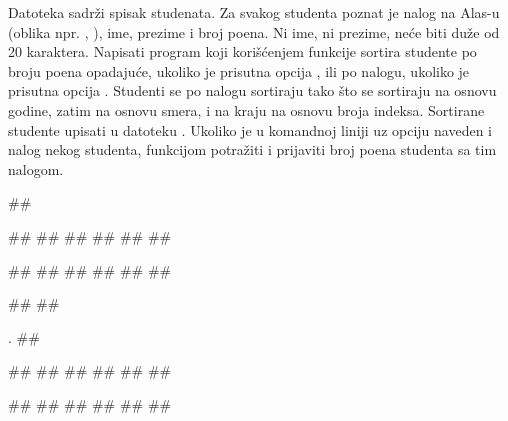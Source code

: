 \begin{Answer}[ref=3_37]
\end{Answer}
\begin{Exercise}[label=3_38]
  Datoteka  sadrži spisak studenata. Za svakog
  studenta poznat je nalog na Alas-u (oblika npr. ,
  ), ime, prezime i broj poena. Ni ime, ni prezime, neće
  biti duže od 20 karaktera. Napisati program koji korišćenjem funkcije  sortira
  studente po broju poena opadajuće, ukoliko je prisutna opcija , ili po nalogu, 
  ukoliko je prisutna opcija . Studenti se po nalogu
  sortiraju tako što se sortiraju na osnovu godine, zatim na osnovu
  smera, i na kraju na osnovu broja indeksa. Sortirane studente
  upisati u datoteku . Ukoliko je u komandnoj liniji
  uz opciju  naveden i nalog nekog studenta, funkcijom
   potražiti i prijaviti broj poena studenta sa tim
  nalogom.
  
\begin{miditest}
\begin{test}{1}
##
  
##
##
##
##
##
##

##
##
##
##
##
##
  
#\naslovIzlaz#
##
\end{test}
\end{miditest}
\begin{miditest}
\begin{test}{2}.
##
  
##
##
##
##
##
##
  
##
##
##
##
##
##
\end{test}
\end{miditest}
  
\end{Exercise}

